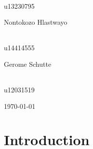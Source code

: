 \documentclass[a4paper,12pt]{article}
\begin{document}
\begin{titlepage}
\begin{center}
\begin{minipage}{0.4\textwidth}
\begin{flushleft}
\end{flushleft}
\end{minipage}
\begin{minipage}{0.4\textwidth}
\begin{flushright} \large
\emph{} \\
u13230795  
\end{flushright}
\end{minipage}
\begin{minipage}{0.4\textwidth}
\begin{flushleft} \large
Nontokozo Hlastwayo
\end{flushleft}
\end{minipage}
\begin{minipage}{0.4\textwidth}
\begin{flushright} \large
\emph{} \\
u14414555
\end{flushright}
\end{minipage}
\begin{minipage}{0.4\textwidth}
\begin{flushleft} \large
Gerome Schutte
\end{flushleft}
\end{minipage}
\begin{minipage}{0.4\textwidth}
\begin{flushright} \large
\emph{} \\
u12031519
\end{flushright}
\end{minipage}
\vfill

{\large \today}
\end{center}
\end{titlepage}
\footnotesize
\normalsize

%
%
%
%
%
%
%

\tableofcontents
\newpage
\setlength{\parindent}{0em}

\section{Introduction}
\end{document}
